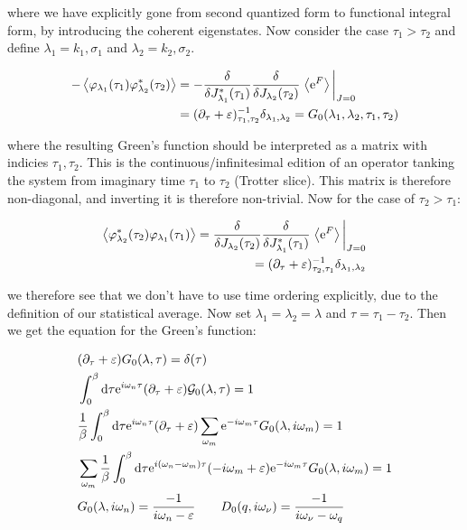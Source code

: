 where we have explicitly gone from second quantized form to functional integral form, by introducing the coherent eigenstates. Now consider the case $\tau_1 > \tau_2$ and define $\lambda_1 = k_1, \sigma_1$ and $\lambda_2 = k_2, \sigma_2$. 

\begin{align*}
    - \expval{\varphi_{\lambda_1}(\tau_1) \varphi^{*}_{\lambda_2}(\tau_2)} &= - \fdv{}{J_{\lambda_1}^*(\tau_1)} \fdv{}{J_{\lambda_2}(\tau_2)} \eval{\expval{\e^F}}_{J = 0} \\ &= (\partial_\tau + \varepsilon)^{-1}_{\tau_1, \tau_2} \delta_{\lambda_1, \lambda_2} = G_{0}(\lambda_1, \lambda_2, \tau_1, \tau_2) 
\end{align*}

where the resulting Green's function should be interpreted as a matrix with indicies $\tau_1, \tau_2$. This is the continuous/infinitesimal edition of an operator tanking the system from imaginary time $\tau_1$ to $\tau_2$ (Trotter slice). This matrix is therefore non-diagonal, and inverting it is therefore non-trivial. Now for the case of $\tau_2 > \tau_1$: 

\begin{align*}
    \expval{\varphi^{*}_{\lambda_2}(\tau_2)\varphi_{\lambda_1}(\tau_1) } =  \fdv{}{J_{\lambda_2}(\tau_2)} \fdv{}{J_{\lambda_1}^*(\tau_1)}\eval{\expval{\e^F}}_{J = 0} \\ = (\partial_\tau + \varepsilon)^{-1}_{\tau_2, \tau_1} \delta_{\lambda_1, \lambda_2} 
\end{align*}

we therefore see that we don't have to use time ordering explicitly, due to the definition of our statistical average. Now set $\lambda_1 = \lambda_2 = \lambda$ and $\tau = \tau_1 - \tau_2$. Then we get the equation for the Green's function: 

\begin{align*}
    &(\partial_\tau + \varepsilon)G_0(\lambda, \tau) = \delta(\tau) \\ 
    &\int_{0}^{\beta} \dd \tau \mathrm{e}^{i\omega_n \tau}(\partial_\tau + \varepsilon)\mathcal{G}_0(\lambda, \tau) = 1 \\ 
    &\frac{1}{\beta}\int_{0}^{\beta} \dd \tau \mathrm{e}^{i\omega_n \tau} (\partial_\tau + \varepsilon) \sum_{\omega_m} \mathrm{e}^{-i\omega_m \tau}G_0(\lambda, i\omega_m) = 1 \\ 
    &\sum_{\omega_m} \frac{1}{\beta}\int_{0}^{\beta} \dd \tau \mathrm{e}^{i(\omega_n - \omega_m)\tau} (-i\omega_m + \varepsilon) \mathrm{e}^{-i\omega_m \tau}G_0(\lambda, i\omega_m) = 1 \\ 
    &G_0(\lambda, i\omega_n) = \frac{-1}{i\omega_n - \varepsilon} \quad \quad D_0(q, i\omega_\nu) = \frac{-1}{i\omega_\nu - \omega_q}
\end{align*}

